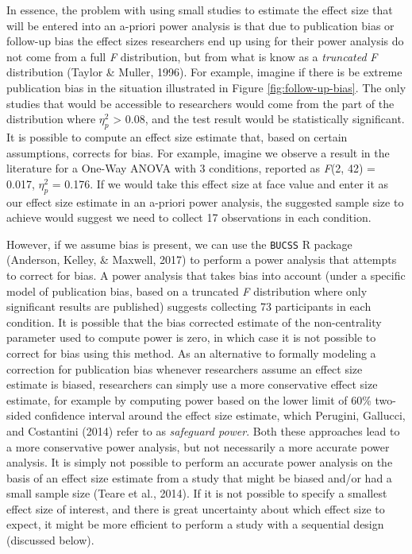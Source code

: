 \documentclass[
  english,
  ,jou, a4paper,floatsintext]{apa6}
\begin{document}
In essence, the problem with using small studies to estimate the effect size that will be entered into an a-priori power analysis is that due to publication bias or follow-up bias the effect sizes researchers end up using for their power analysis do not come from a full \emph{F} distribution, but from what is know as a \emph{truncated} \emph{F} distribution (Taylor \& Muller, 1996). For example, imagine if there is be extreme publication bias in the situation illustrated in Figure \ref{fig:follow-up-bias}. The only studies that would be accessible to researchers would come from the part of the distribution where \(\eta_p^2\) \textgreater{} 0.08, and the test result would be statistically significant. It is possible to compute an effect size estimate that, based on certain assumptions, corrects for bias. For example, imagine we observe a result in the literature for a One-Way ANOVA with 3 conditions, reported as \emph{F}(2, 42) = 0.017, \(\eta_p^2\) = 0.176. If we would take this effect size at face value and enter it as our effect size estimate in an a-priori power analysis, the suggested sample size to achieve would suggest we need to collect 17 observations in each condition.

However, if we assume bias is present, we can use the \texttt{BUCSS} R package (Anderson, Kelley, \& Maxwell, 2017) to perform a power analysis that attempts to correct for bias. A power analysis that takes bias into account (under a specific model of publication bias, based on a truncated \emph{F} distribution where only significant results are published) suggests collecting 73 participants in each condition. It is possible that the bias corrected estimate of the non-centrality parameter used to compute power is zero, in which case it is not possible to correct for bias using this method. As an alternative to formally modeling a correction for publication bias whenever researchers assume an effect size estimate is biased, researchers can simply use a more conservative effect size estimate, for example by computing power based on the lower limit of 60\% two-sided confidence interval around the effect size estimate, which Perugini, Gallucci, and Costantini (2014) refer to as \emph{safeguard power}. Both these approaches lead to a more conservative power analysis, but not necessarily a more accurate power analysis. It is simply not possible to perform an accurate power analysis on the basis of an effect size estimate from a study that might be biased and/or had a small sample size (Teare et al., 2014). If it is not possible to specify a smallest effect size of interest, and there is great uncertainty about which effect size to expect, it might be more efficient to perform a study with a sequential design (discussed below).
\end{document}
